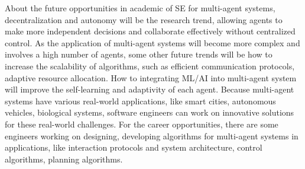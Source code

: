 \documentclass[11pt]{article}
\begin{document}
About the future opportunities in academic of SE for multi-agent systems, decentralization and autonomy will be the research trend, allowing agents to make more independent decisions and collaborate effectively without centralized control. As the application of multi-agent systems will become more complex and involves a high number of agents, some other future trends will be how to increase the scalability of algorithms, such as efficient communication protocols, adaptive resource allocation. How to integrating ML/AI into multi-agent system will improve the self-learning and adaptivity of each agent. Because multi-agent systems have various real-world applications, like smart cities, autonomous vehicles, biological systems, software engineers can work on innovative solutions for these real-world challenges. For the career opportunities, there are some engineers working on designing, developing algorithms for multi-agent systems in applications, like interaction protocols and system architecture, control algorithms, planning algorithms. 

% 
\newpage
\printbibliography
\end{document}
